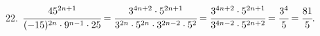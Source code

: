 22. $\cfrac{45^{2n+1}}{(-15)^{2n}\cdot 9^{n-1}\cdot25}=\cfrac{3^{4n+2}\cdot5^{2n+1}}{3^{2n}\cdot5^{2n}\cdot 3^{2n-2}\cdot5^2}=
\cfrac{3^{4n+2}\cdot5^{2n+1}}{3^{4n-2}\cdot5^{2n+2}}=\cfrac{3^4}{5}=\cfrac{81}{5}.$\\
